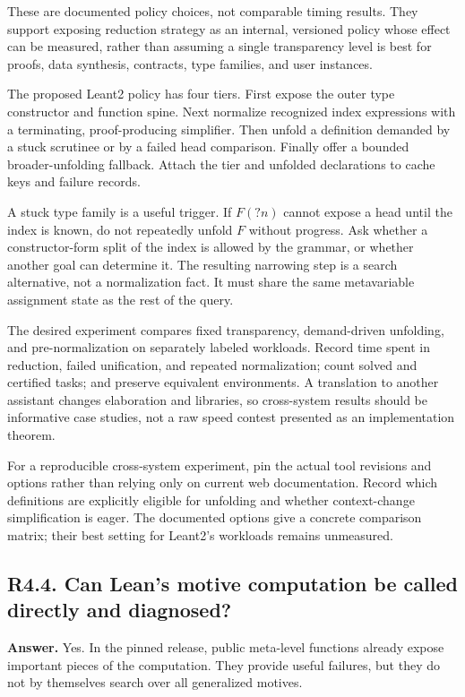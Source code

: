 \documentclass[11pt,a4paper]{article}
\newcommand{\code}[1]{\texttt{\detokenize{#1}}}
\newcommand{\question}[2]{\subsection{#1. #2}\label{q:#1}}
\theoremstyle{definition}
\theoremstyle{remark}
\begin{document}
These are documented policy choices, not comparable timing results. They support exposing reduction strategy as an internal, versioned policy whose effect can be measured, rather than assuming a single transparency level is best for proofs, data synthesis, contracts, type families, and user instances.

The proposed Leant2 policy has four tiers. First expose the outer type constructor and function spine. Next normalize recognized index expressions with a terminating, proof-producing simplifier. Then unfold a definition demanded by a stuck scrutinee or by a failed head comparison. Finally offer a bounded broader-unfolding fallback. Attach the tier and unfolded declarations to cache keys and failure records.

A stuck type family is a useful trigger. If $F(\mathord{?}n)$ cannot expose a head until the index is known, do not repeatedly unfold $F$ without progress. Ask whether a constructor-form split of the index is allowed by the grammar, or whether another goal can determine it. The resulting narrowing step is a search alternative, not a normalization fact. It must share the same metavariable assignment state as the rest of the query.

The desired experiment compares fixed transparency, demand-driven unfolding, and pre-normalization on separately labeled workloads. Record time spent in reduction, failed unification, and repeated normalization; count solved and certified tasks; and preserve equivalent environments. A translation to another assistant changes elaboration and libraries, so cross-system results should be informative case studies, not a raw speed contest presented as an implementation theorem.

For a reproducible cross-system experiment, pin the actual tool revisions and options rather than relying only on current web documentation. Record which definitions are explicitly eligible for unfolding and whether context-change simplification is eager. The documented \code{sauto} options give a concrete comparison matrix; their best setting for Leant2's workloads remains unmeasured.

\question{R4.4}{Can Lean's motive computation be called directly and diagnosed?}

\textbf{Answer.} Yes. In the pinned release, public meta-level functions already expose important pieces of the computation. They provide useful failures, but they do not by themselves search over all generalized motives.
\end{document}
